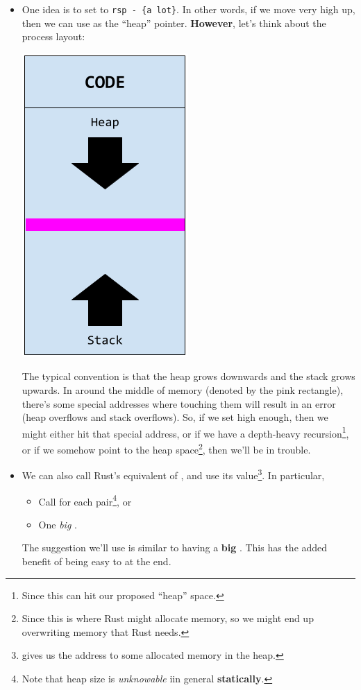 \documentclass[letterpaper]{article}
\begin{document}
\begin{itemize}
    \item One idea is to set  to \verb|rsp - {a lot}|. In other words, if we move  very high up, then we can use  as the ``heap'' pointer. \textbf{However}, let's think about the process layout:
    \begin{center}
        \includegraphics[scale=0.4]{../assets/process_layout.png}
    \end{center}
    The typical convention is that the heap grows downwards and the stack grows upwards. In around the middle of memory (denoted by the pink rectangle), there's some special addresses where touching them will result in an error (heap overflows and stack overflows). So, if we set  high enough, then we might either hit that special address, or if we have a depth-heavy recursion\footnote{Since this can hit our proposed ``heap'' space.}, or if we somehow point  to the heap space\footnote{Since this is where Rust might allocate memory, so we might end up overwriting memory that Rust needs.}, then we'll be in trouble. 

    \item We can also call Rust's equivalent of , and use its value\footnote{ gives us the address to some allocated memory in the heap.}. In particular, 
    \begin{itemize}
        \item Call  for each pair\footnote{Note that heap size is \emph{unknowable} iin general \textbf{statically}.}, or 
        \item One \emph{big} .
    \end{itemize}
    The suggestion we'll use is similar to having a \textbf{big} . This has the added benefit of being easy to  at the end. 
\end{itemize}
\end{document}
